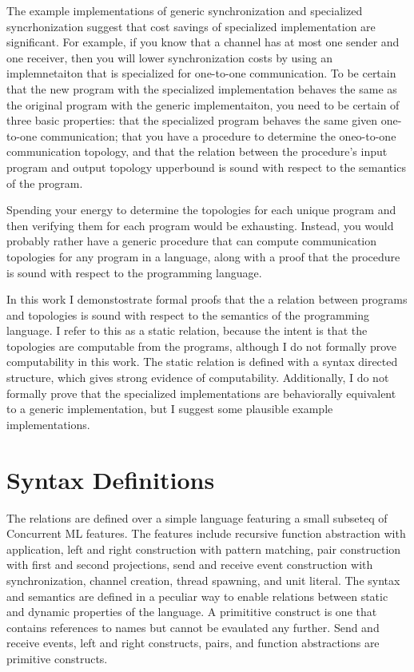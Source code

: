 \documentclass{article}
\begin{document}
The example implementations of generic synchronization and specialized syncrhonization suggest
that cost savings of specialized implementation are significant.  For example, if you know that
a channel has at most one sender and one receiver, then you will lower synchronization costs by
using an implemnetaiton that is specialized for one-to-one communication.  To be certain that
the new program with the specialized implementation behaves the same as the original program
with the generic implementaiton, you need to be certain of three basic properties: that the
specialized program behaves the same given one-to-one communication; that you have a procedure
to determine the oneo-to-one communication topology, and that the relation between the
procedure's input program and output topology upperbound is sound with respect to the semantics
of the program.  

Spending your energy to determine the topologies for each unique program and then verifying
them for each program would be exhausting. Instead, you would probably rather have a generic
procedure that can compute communication topologies for any program in a language, along with
a proof that the procedure is sound with respect to the programming language.

In this work I demonstostrate formal proofs that the a relation between programs and topologies
is sound with respect to the semantics of the programming language.  I refer to this as a
static relation, because the intent is that the topologies are computable from the programs,
although I do not formally prove computability in this work.  The static relation is defined
with a syntax directed structure, which gives strong evidence of computability.  Additionally,
I do not formally prove that the specialized implementations are behaviorally equivalent to a
generic implementation, but I suggest some plausible example implementations.

\section{Syntax Definitions}
The relations are defined over a simple language featuring a small subseteq of Concurrent ML
features. The features include recursive function abstraction with application, left and right
construction with pattern matching, pair construction with first and second projections, send
and receive event construction with synchronization, channel creation, thread spawning, and
unit literal.  The syntax and semantics are defined in a peculiar way to enable relations
between static and dynamic properties of the language.  A primititive construct is one that
contains references to names but cannot be evaulated any further. Send and receive events,
left and right constructs, pairs, and function abstractions are primitive constructs.
\end{document}
